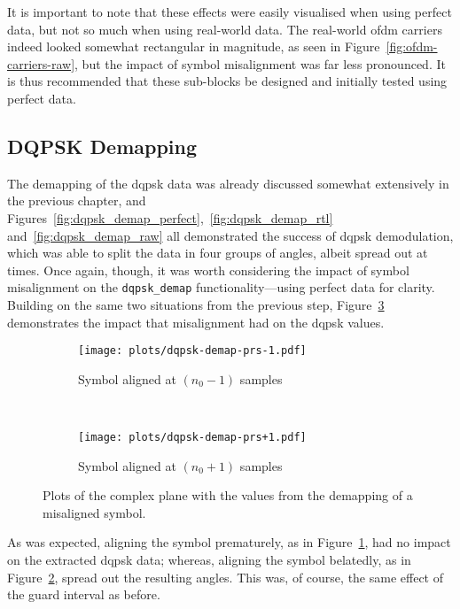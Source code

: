 \documentclass[class=report,11pt,crop=false]{standalone}
\begin{document}
It is important to note that these effects were easily visualised when using perfect data, but not so much when using real-world data. The real-world \gls{ofdm} carriers indeed looked somewhat rectangular in magnitude, as seen in Figure~\ref{fig:ofdm-carriers-raw}, but the impact of symbol misalignment was far less pronounced. It is thus recommended that these sub-blocks be designed and initially tested using perfect data.
  
\subsection{DQPSK Demapping}
The demapping of the \gls{dqpsk} data was already discussed somewhat extensively in the previous chapter, and Figures~\ref{fig:dqpsk_demap_perfect},~\ref{fig:dqpsk_demap_rtl} and~\ref{fig:dqpsk_demap_raw} all demonstrated the success of \gls{dqpsk} demodulation, which was able to split the data in four groups of angles, albeit spread out at times. Once again, though, it was worth considering the impact of symbol misalignment on the \texttt{dqpsk\_demap} functionality---using perfect data for clarity. Building on the same two situations from the previous step, Figure~\ref{fig:dqpsk-demap-prs} demonstrates the impact that misalignment had on the \gls{dqpsk} values.

\begin{figure}[htbp]
  \centering
  \captionsetup{type=figure}
  \begin{subfigure}[t]{0.45\textwidth}
    \centering
    \captionsetup{type=figure}
    \texttt{[image: plots/dqpsk-demap-prs-1.pdf]}
    \caption{Symbol aligned at \((n_0 - 1)\) samples}
    \label{fig:dqpsk-demap-prs-1}
  \end{subfigure}%
  ~ 
  \begin{subfigure}[t]{0.45\textwidth}
    \centering
    \captionsetup{type=figure}
    \texttt{[image: plots/dqpsk-demap-prs+1.pdf]}
    \caption{Symbol aligned at \((n_0 + 1)\) samples}
    \label{fig:dqpsk-demap-prs+1}
  \end{subfigure}
  \caption{Plots of the complex plane with the values from the  demapping of a misaligned  symbol.}
  \label{fig:dqpsk-demap-prs}
\end{figure}

As was expected, aligning the symbol prematurely, as in Figure~\ref{fig:dqpsk-demap-prs-1}, had no impact on the extracted \gls{dqpsk} data; whereas, aligning the symbol belatedly, as in Figure~\ref{fig:dqpsk-demap-prs+1}, spread out the resulting angles. This was, of course, the same effect of the guard interval as before.
\end{document}
